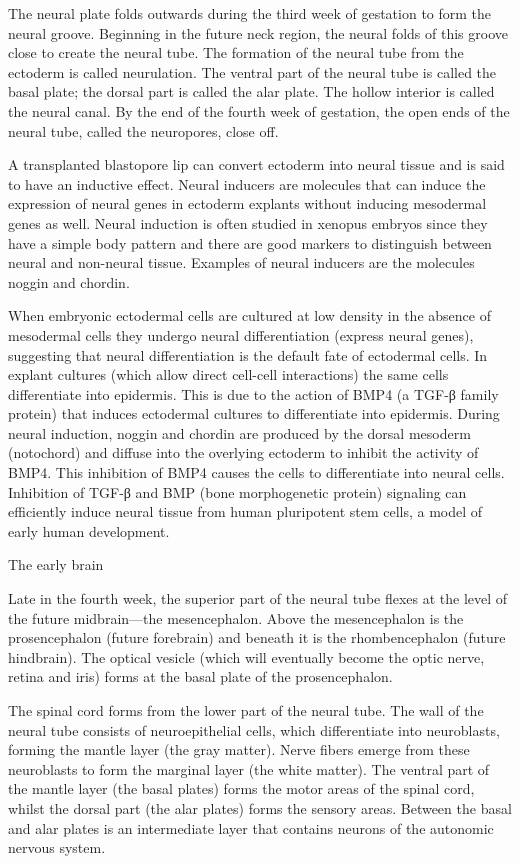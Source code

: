\documentclass[]{book}
\begin{document}
The neural plate folds outwards during the third week of gestation to form the neural groove. Beginning in the future neck region, the neural folds of this groove close to create the neural tube. The formation of the neural tube from the ectoderm is called neurulation. The ventral part of the neural tube is called the basal plate; the dorsal part is called the alar plate. The hollow interior is called the neural canal. By the end of the fourth week of gestation, the open ends of the neural tube, called the neuropores, close off.

A transplanted blastopore lip can convert ectoderm into neural tissue and is said to have an inductive effect. Neural inducers are molecules that can induce the expression of neural genes in ectoderm explants without inducing mesodermal genes as well. Neural induction is often studied in xenopus embryos since they have a simple body pattern and there are good markers to distinguish between neural and non-neural tissue. Examples of neural inducers are the molecules noggin and chordin.

When embryonic ectodermal cells are cultured at low density in the absence of mesodermal cells they undergo neural differentiation (express neural genes), suggesting that neural differentiation is the default fate of ectodermal cells. In explant cultures (which allow direct cell-cell interactions) the same cells differentiate into epidermis. This is due to the action of BMP4 (a TGF-β family protein) that induces ectodermal cultures to differentiate into epidermis. During neural induction, noggin and chordin are produced by the dorsal mesoderm (notochord) and diffuse into the overlying ectoderm to inhibit the activity of BMP4. This inhibition of BMP4 causes the cells to differentiate into neural cells. Inhibition of TGF-β and BMP (bone morphogenetic protein) signaling can efficiently induce neural tissue from human pluripotent stem cells, a model of early human development.

The early brain

Late in the fourth week, the superior part of the neural tube flexes at the level of the future midbrain---the mesencephalon. Above the mesencephalon is the prosencephalon (future forebrain) and beneath it is the rhombencephalon (future hindbrain). The optical vesicle (which will eventually become the optic nerve, retina and iris) forms at the basal plate of the prosencephalon.

The spinal cord forms from the lower part of the neural tube. The wall of the neural tube consists of neuroepithelial cells, which differentiate into neuroblasts, forming the mantle layer (the gray matter). Nerve fibers emerge from these neuroblasts to form the marginal layer (the white matter). The ventral part of the mantle layer (the basal plates) forms the motor areas of the spinal cord, whilst the dorsal part (the alar plates) forms the sensory areas. Between the basal and alar plates is an intermediate layer that contains neurons of the autonomic nervous system.
\end{document}
